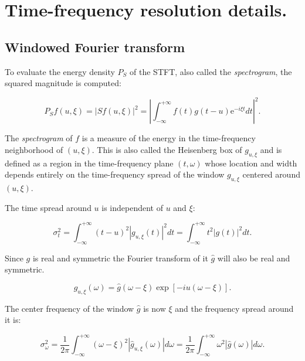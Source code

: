 \chapter{Time-frequency resolution details.}
\section{Windowed Fourier transform}\label{ap:TimeFreqResolutionFourier}
To evaluate the energy density $P_S$ of the STFT, also called the \emph{spectrogram}, the squared magnitude is computed:

\begin{equation}\label{eq:Mallat1999_3copy}
P_S f(u,\xi) = |S f(u,\xi)|^2 = \left| \int^{+\infty}_{-\infty} f(t)g(t-u)\mathrm{e}^{-i\xi t} dt \right|^2.
\end{equation}

The \emph{spectrogram} of $f$ is a measure of the energy in the time-frequency neighborhood of $(u,\xi)$. This is also called the Heisenberg box of $g_{u,\xi}$ and is defined as a region in the time-frequency plane $(t, \omega)$ whose location and width depends entirely on the time-frequency spread of the window $g_{u,\xi}$ centered around $(u,\xi)$\cite{Mallat1999}.

The time spread around $u$ is independent of $u$ and $\xi$:

\begin{equation}\label{eq:Mallat1999_413}
\sigma^2_t = \int^{+\infty}_{-\infty} (t-u)^2 |g_{u,\xi}(t)|^2 dt = \int^{+\infty}_{-\infty} t^2 |g(t)|^2 dt.
\end{equation}

Since $g$ is real and symmetric the Fourier transform of it $\hat{g}$ will also be real and symmetric.

\begin{equation}\label{eq:Mallat1999_414}
\hat{g}_{u,\xi}(\omega) = \hat{g}(\omega - \xi) \exp{\left[ -iu(\omega - \xi)\right]}.
\end{equation}

The center frequency of the window $\hat{g}$ is now $\xi$ and the frequency spread around it is:

\begin{equation}\label{eq:Mallat1999_415}
\sigma^2_\omega = \frac{1}{2\pi} \int^{+\infty}_{-\infty} (\omega - \xi)^2 |\hat{g}_{u,\xi}(\omega)| d\omega = \frac{1}{2\pi} \int^{+\infty}_{-\infty} \omega^2 |\hat{g}(\omega)| d\omega.
\end{equation}

